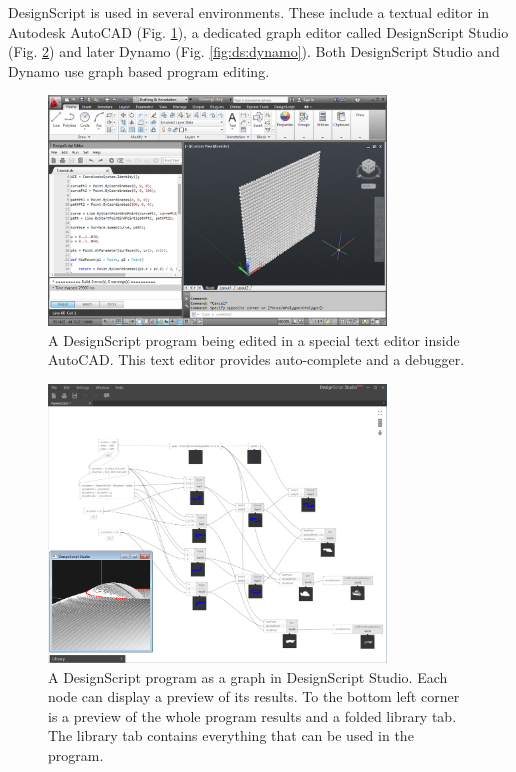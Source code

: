 DesignScript is used in several environments.
These include a textual editor in Autodesk AutoCAD (Fig. \ref{fig:ds:autocad}), a dedicated graph editor called DesignScript Studio (Fig. \ref{fig:ds:dsstudio}) and later Dynamo (Fig. \ref{fig:ds:dynamo}).
Both DesignScript Studio and Dynamo use graph based program editing.

\begin{figure}
	\centering
	\includegraphics[width=0.8\textwidth]{images/ds_autocad}
	\caption{A DesignScript program being edited in a special text editor inside AutoCAD. This text editor provides auto-complete and a debugger.}
	\label{fig:ds:autocad}
\end{figure}

\begin{figure}
	\centering
	\includegraphics[width=0.8\textwidth]{images/ds_dsstudio}
	\caption{A DesignScript program as a graph in DesignScript Studio. Each node can display a preview of its results. To the bottom left corner is a preview of the whole program results and a folded library tab. The library tab contains everything that can be used in the program.}
	\label{fig:ds:dsstudio}
\end{figure}

